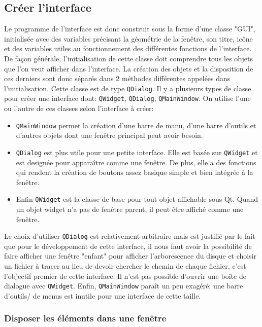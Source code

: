 \documentclass[a4paper, 11pt]{article}
\begin{document}
\subsection{Créer l'interface}

Le programme de l'interface est donc construit sous la forme d'une classe "GUI", initialisée avec des variables précisant la géométrie de la fenêtre, son titre, icône et des variables utiles au fonctionnement des différentes fonctions de l'interface. De façon générale, l'initialisation de cette classe doit comprendre tous les objets que l'on veut afficher dans l'interface. La création des objets et la disposition de ces derniers sont donc séparés dans 2 méthodes différentes appelées dans l'initialisation. Cette classe est de type \verb|QDialog|. Il y a plusieurs types de classe pour créer une interface dont: \verb|QWidget|, \verb|QDialog|, \verb|QMainWindow|. On utilise l'une ou l'autre de ces classes selon l'interface à créer: 
\begin{itemize}
	\item \verb|QMainWindow| permet la création d'une barre de manu, d'une barre d'outils et d'autres objets dont une fenêtre principal peut avoir besoin.
	\item \verb|QDialog| est plus utile pour une petite interface. Elle est basée sur \verb|QWidget| et est designée pour apparaître comme une fenêtre. De plus, elle a des fonctions qui rendent la création de boutons assez basique simple et bien intégrée à la fenêtre.
	\item Enfin \verb|QWidget| est la classe de base pour tout objet affichable sous Qt. Quand un objet widget n'a pas de fenêtre parent, il peut être affiché comme une fenêtre. 
\end{itemize}

Le choix d'utiliser \verb|QDialog| est relativement arbitraire mais est justifié par le fait que pour le développement de cette interface, il nous faut avoir la possibilité de faire afficher une fenêtre "enfant" pour afficher l'arborescence du disque et choisir un fichier à tracer au lieu de devoir chercher le chemin de chaque fichier, c'est l'objectif premier de cette interface. Il n'est pas possible d'ouvrir une boîte de dialogue avec \verb|QWidget|. Enfin, \verb|QMainWindow| paraît un peu exagéré: une barre d'outils/ de menus est inutile pour une interface de cette taille.

\subsubsection{Disposer les éléments dans une fenêtre}
\end{document}
